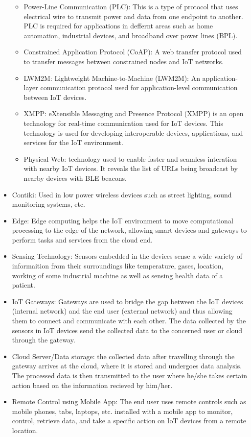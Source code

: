 \begin{itemize}
\begin{itemize}
        \item Power-Line Communication (PLC): This is a type of protocol that uses electrical wire to transmit power and data from one endpoint to another. PLC is required for applications in deffernt areas such as home automation, industrial devices, and broadband over power lines (BPL).
        \item Constrained Application Protocol (CoAP): A web transfer protocol used to transfer messages between constrained nodes and IoT networks.
        \item LWM2M: Lightweight Machine-to-Machine (LWM2M): An application-layer communication protocol used for application-level communication between IoT devices.
        \item XMPP: eXtensible Messaging and Presence Protocol (XMPP) is an open technology for real-time communication used for IoT devices. This technology is used for developing interoperable devices, applications, and services for the IoT environment.
        \item Physical Web: technology used to enable faster and seamless interation with nearby IoT devices. It reveals the list of URLs being broadcast by nearby devices with BLE beacons.
    \end{itemize}
    \item Contiki: Used in low power wireless devices such as street lighting, sound monitoring systems, etc.
    \item Edge: Edge computing helps the IoT environment to move computational processing to the edge of the network, allowing smart devices and gateways to perform tasks and services from the cloud end.
    \item Sensing Technology: Sensors embedded in the devices sense a wide variety of informaition from their surroundings like temperature, gases, location, working of some industrial machine as well as sensing health data of a patient.
    \item IoT Gateways: Gateways are used to bridge the gap between the IoT devices (internal network) and the end user (external network) and thus allowing them to connect and communicate with each other. The data collected by the sensors in IoT devices send the collected data to the concerned user or cloud through the gateway.
    \item Cloud Server/Data storage: the collected data after travelling through the gateway arrives at the cloud, where it is stored and undergoes data analysis. The processed data is then transmitted to the user where he/she takes certain action based on the information recieved by him/her.
    \item Remote Control using Mobile App: The end user uses remote controls such as mobile phones, tabs, laptops, etc. installed with a mobile app to monitor, control, retrieve data, and take a specific action on IoT devices from a remote location.
\end{itemize}
